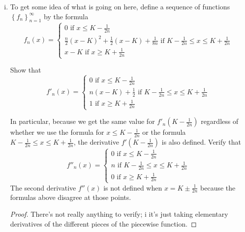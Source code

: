 \documentclass{article}
\newcommand{\E}{\mathbb{E}}
\newcommand{\seq}[1]{\left\{ #1 \right\}}
\theoremstyle{definition}
\theoremstyle{definition}
\begin{document}
\begin{enumerate}
\begin{enumerate}[(i)]
\begin{proof}
        Meanwhile, for the right hand side, we obtain:
        \begin{align*}
            \E[RHS] &= \E[f(W(0))] + \E\bigg[\underset{\text{It\^{o} Integral, martingale}}{\underbrace{\int_0^T f'(W(t))dW(t)}}\bigg] \\
            &= \E[(0-K)^+] = \E[0] = 0
        \end{align*}
        
        \end{proof}
        
        \item To get some idea of what is going on here, define a sequence of functions $\seq{f_n}_{n=1}^\infty$ by the formula
        $$ f_n(x)  = \begin{cases} 
        0 \text{ if } x \leq K - \frac{1}{2n} \\
        \frac{n}{2}(x-K)^2+\frac{1}{2}(x-K)+\frac{1}{8n} \text{ if } K-\frac{1}{2n} \leq x \leq K + \frac{1}{2n} \\
        x-K \text{ if } x \geq K + \frac{1}{2n}
        \end{cases}$$
        
        Show that
        $$ f'_n(x)  = \begin{cases} 
        0 \text{ if } x \leq K - \frac{1}{2n} \\
        n(x-K)+\frac{1}{2} \text{ if } K-\frac{1}{2n} \leq x \leq K + \frac{1}{2n} \\
        1 \text{ if } x \geq K + \frac{1}{2n}
        \end{cases}$$
        
        In particular, because we get the same value for $f'_n(K-\frac{1}{2n})$ regardless of whether we use the formula for $x \le K - \frac{1}{2n}$ or the formula $K-\frac{1}{2n}\le x \le K+ \frac{1}{2n}$, the derivative $f'(K-\frac{1}{2n})$ is also defined. Verify that
        $$ f''_n(x)  = \begin{cases} 
        0 \text{ if } x \leq K - \frac{1}{2n} \\
        n \text{ if } K-\frac{1}{2n} \leq x \leq K + \frac{1}{2n} \\
        0 \text{ if } x \geq K + \frac{1}{2n}
        \end{cases}$$
        The second derivative $f''(x)$ is not defined when $x = K \pm \frac{1}{2n}$ because the formulas above disagree at those points.
        
        \begin{proof} There's not really anything to verify; i
        it's just taking elementary derivatives of the different pieces of the piecewise function.
        \end{proof}
        

\end{enumerate}
\end{enumerate}
\end{document}
